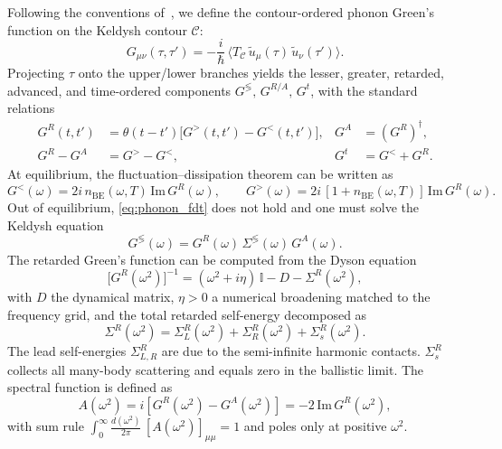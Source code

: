 Following the conventions of~\citet{wang_nonequilibrium_2014}, we
define the contour-ordered phonon Green's function on the Keldysh contour $\mathcal{C}$:
\begin{equation}\label{eq:G_def}
  G_{\mu\nu}(\tau,\tau')
  = -\frac{i}{\hbar}\,
    \bigl\langle T_{\mathcal{C}}\,
      \tilde{u}_\mu(\tau)\,\tilde{u}_\nu(\tau')\bigr\rangle.
\end{equation}
Projecting $\tau$ onto the upper/lower branches yields the
lesser, greater, retarded, advanced, and time-ordered components
$G^{\lessgtr},\, G^{R/A},\, G^t$, with the standard relations
\begin{align}
  G^R(t,t') &= \theta(t-t')\bigl[G^>(t,t') - G^<(t,t')\bigr], &
  G^A &= (G^R)^\dagger,\\
  G^R - G^A &= G^> - G^<, &
  G^t &= G^< + G^R.
\end{align}
At equilibrium, the fluctuation--dissipation theorem can be written as~\cite[Eq. 24]{wang_nonequilibrium_2014}
\begin{equation}\label{eq:phonon_fdt}
  G^<(\omega) = 2 i\,n_{\mathrm{BE}}(\omega,T)\,\mathrm{Im}\,G^R(\omega),\qquad
  G^>(\omega) = 2 i\,[1 + n_{\mathrm{BE}}(\omega,T)]\,\mathrm{Im}\,G^R(\omega).
\end{equation}
Out of
equilibrium, \cref{eq:phonon_fdt} does not hold and one must solve the
Keldysh equation
\begin{equation}\label{eq:keldysh_eq}
  G^{\lessgtr}(\omega) = G^R(\omega)\,\Sigma^{\lessgtr}(\omega)\,G^A(\omega).
\end{equation}
The retarded Green's function can be computed from the Dyson equation
\begin{equation}\label{eq:system}
  \bigl[G^R(\omega^2)\bigr]^{-1}
  = (\omega^2 + i\eta)\,\mathbb{I}
    - D
    - \Sigma^R(\omega^2),
\end{equation}
with $D$ the dynamical matrix, $\eta>0$ a numerical broadening matched
to the frequency grid, and the total retarded self-energy decomposed as
\begin{equation}
  \Sigma^R(\omega^2) = \Sigma_L^R(\omega^2) + \Sigma_R^R(\omega^2)
                      + \Sigma_s^R(\omega^2).
\end{equation}
The lead self-energies $\Sigma_{L,R}^R$ are due to the semi-infinite harmonic
contacts. $\Sigma_s^R$ collects all many-body scattering and equals zero
in the ballistic limit. The spectral function is defined as
\begin{equation}\label{eq:spectral}
  A(\omega^2) = i[G^R(\omega^2)-G^A(\omega^2)] = -2\,\mathrm{Im}\,G^R(\omega^2),
\end{equation}
with sum rule $\int_0^\infty\!\frac{d(\omega^2)}{2\pi}\,[A(\omega^2)]_{\mu\mu}
= 1$ and poles only at positive $\omega^2$.

